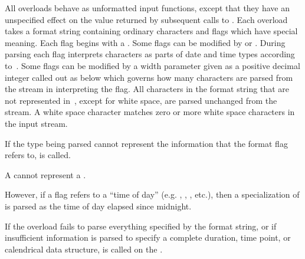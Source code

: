 \pnum
All  overloads behave as unformatted input functions,
except that they have an unspecified effect
on the value returned by subsequent calls to .
Each overload takes a format string containing ordinary characters
and flags which have special meaning.
Each flag begins with a \tcode{\%}.
Some flags can be modified by  or .
During parsing each flag interprets characters as parts of date and time types
according to~.
Some flags can be modified by a width parameter
given as a positive decimal integer called out as  below
which governs how many characters are parsed from the stream in interpreting the flag.
All characters in the format string that are not represented in~,
except for white space, are parsed unchanged from the stream.
A white space character matches zero or more white space characters in the input stream.

\pnum
If the type being parsed cannot represent
the information that the format flag refers to,
 is called.
\begin{example}
A  cannot represent a .
\end{example}
However, if a flag refers to a ``time of day''
(e.g. , , , etc.),
then a specialization of  is parsed as
the time of day elapsed since midnight.

\pnum
If the  overload fails to parse
everything specified by the format string,
or if insufficient information is parsed to specify a complete
duration, time point, or calendrical data structure,
is called on the .


